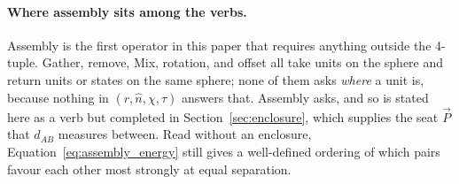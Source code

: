 \documentclass[12pt, a4paper]{article}
\begin{document}
\paragraph{Where assembly sits among the verbs.}
Assembly is the first operator in this paper that requires anything
outside the 4-tuple. Gather, remove, Mix, rotation, and offset all
take units on the sphere and return units or states on the same
sphere; none of them asks \emph{where} a unit is, because nothing in
$(r,\hat n,\chi,\tau)$ answers that. Assembly asks, and so is stated
here as a verb but completed in Section~\ref{sec:enclosure}, which
supplies the seat $\vec P$ that $d_{AB}$ measures between. Read
without an enclosure, Equation~\eqref{eq:assembly_energy} still
gives a well-defined ordering of which pairs favour each other most
strongly at equal separation.
\end{document}
